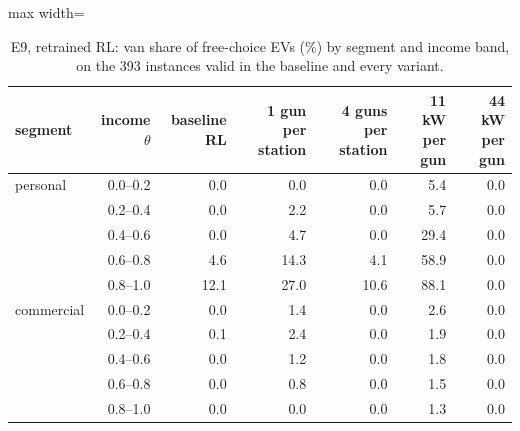 \begin{table}[H]\centering
\small
\caption{E9, retrained RL: van share of free-choice EVs (\%) by segment and income band, on the 393 instances valid in the baseline and every variant.}\label{tab:bandE9}
\begin{adjustbox}{max width=\textwidth}\begin{tabular}{lrrrrrr}\toprule
segment & income $\theta$ & baseline RL & 1 gun per station & 4 guns per station & 11 kW per gun & 44 kW per gun \\ \midrule
personal & 0.0--0.2 & 0.0 & 0.0 & 0.0 & 5.4 & 0.0 \\
 & 0.2--0.4 & 0.0 & 2.2 & 0.0 & 5.7 & 0.0 \\
 & 0.4--0.6 & 0.0 & 4.7 & 0.0 & 29.4 & 0.0 \\
 & 0.6--0.8 & 4.6 & 14.3 & 4.1 & 58.9 & 0.0 \\
 & 0.8--1.0 & 12.1 & 27.0 & 10.6 & 88.1 & 0.0 \\
commercial & 0.0--0.2 & 0.0 & 1.4 & 0.0 & 2.6 & 0.0 \\
 & 0.2--0.4 & 0.1 & 2.4 & 0.0 & 1.9 & 0.0 \\
 & 0.4--0.6 & 0.0 & 1.2 & 0.0 & 1.8 & 0.0 \\
 & 0.6--0.8 & 0.0 & 0.8 & 0.0 & 1.5 & 0.0 \\
 & 0.8--1.0 & 0.0 & 0.0 & 0.0 & 1.3 & 0.0 \\
\bottomrule\end{tabular}\end{adjustbox}\end{table}
